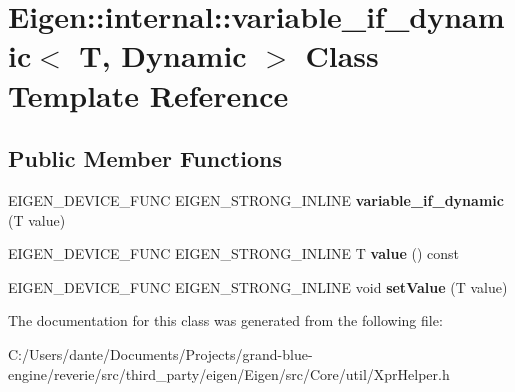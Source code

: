 \hypertarget{class_eigen_1_1internal_1_1variable__if__dynamic_3_01_t_00_01_dynamic_01_4}{}\section{Eigen\+::internal\+::variable\+\_\+if\+\_\+dynamic$<$ T, Dynamic $>$ Class Template Reference}
\label{class_eigen_1_1internal_1_1variable__if__dynamic_3_01_t_00_01_dynamic_01_4}
\subsection*{Public Member Functions}
\begin{DoxyCompactItemize}
\item 
\mbox{\label{class_eigen_1_1internal_1_1variable__if__dynamic_3_01_t_00_01_dynamic_01_4_a5f4b62fe0e834f5d7373f4d347c56bc0}} 
E\+I\+G\+E\+N\+\_\+\+D\+E\+V\+I\+C\+E\+\_\+\+F\+U\+NC E\+I\+G\+E\+N\+\_\+\+S\+T\+R\+O\+N\+G\+\_\+\+I\+N\+L\+I\+NE {\bfseries variable\+\_\+if\+\_\+dynamic} (T value)
\item 
\mbox{\label{class_eigen_1_1internal_1_1variable__if__dynamic_3_01_t_00_01_dynamic_01_4_a888489cd207291bb18a71545f94a7529}} 
E\+I\+G\+E\+N\+\_\+\+D\+E\+V\+I\+C\+E\+\_\+\+F\+U\+NC E\+I\+G\+E\+N\+\_\+\+S\+T\+R\+O\+N\+G\+\_\+\+I\+N\+L\+I\+NE T {\bfseries value} () const
\item 
\mbox{\label{class_eigen_1_1internal_1_1variable__if__dynamic_3_01_t_00_01_dynamic_01_4_a8557515f971577b2e7949a69577513fd}} 
E\+I\+G\+E\+N\+\_\+\+D\+E\+V\+I\+C\+E\+\_\+\+F\+U\+NC E\+I\+G\+E\+N\+\_\+\+S\+T\+R\+O\+N\+G\+\_\+\+I\+N\+L\+I\+NE void {\bfseries set\+Value} (T value)
\end{DoxyCompactItemize}


The documentation for this class was generated from the following file\+:\begin{DoxyCompactItemize}
\item 
C\+:/\+Users/dante/\+Documents/\+Projects/grand-\/blue-\/engine/reverie/src/third\+\_\+party/eigen/\+Eigen/src/\+Core/util/Xpr\+Helper.\+h\end{DoxyCompactItemize}

